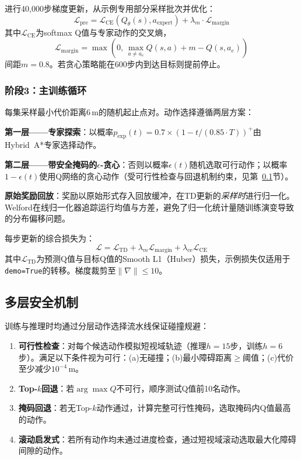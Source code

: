 \documentclass[conference]{IEEEtran}
\newcommand{\Qnet}{Q_\theta}
\begin{document}
进行40{,}000步梯度更新，从示例专用部分采样批次并优化：
\begin{equation}
    \mathcal{L}_{\text{pre}} = \mathcal{L}_{\text{CE}}(\Qnet(s), a_{\text{expert}}) + \lambda_m \cdot \mathcal{L}_{\text{margin}}
\end{equation}
其中$\mathcal{L}_{\text{CE}}$为softmax Q值与专家动作的交叉熵，
\begin{equation}
    \mathcal{L}_{\text{margin}} = \max\left(0,\, \max_{a \neq a_e} Q(s,a) + m - Q(s, a_e)\right)
\end{equation}
间距$m = 0.8$。若贪心策略能在600步内到达目标则提前停止。

\subsubsection{阶段3：主训练循环}

每集采样最小代价距离6\,m的随机起止点对。动作选择遵循两层方案：

\textbf{第一层——专家探索}：以概率$p_{\text{exp}}(t) = 0.7 \times (1 - t / (0.85 \cdot T))^+$由Hybrid~A*专家选择动作。

\textbf{第二层——带安全掩码的$\epsilon$-贪心}：否则以概率$\epsilon(t)$随机选取可行动作；以概率$1 - \epsilon(t)$使用Q网络的贪心动作（受可行性检查与回退机制约束，见第~\ref{sec:safety}节）。

\textbf{原始奖励回放}：奖励以原始形式存入回放缓冲，在TD更新的\emph{采样时}进行归一化。Welford在线归一化器追踪运行均值与方差，避免了归一化统计量随训练演变导致的分布偏移问题。

每步更新的综合损失为：
\begin{equation}
    \mathcal{L} = \mathcal{L}_{\text{TD}} + \lambda_m \mathcal{L}_{\text{margin}} + \lambda_{\text{ce}} \mathcal{L}_{\text{CE}}
\end{equation}
其中$\mathcal{L}_{\text{TD}}$为预测Q值与目标Q值的Smooth L1（Huber）损失，示例损失仅适用于\texttt{demo=True}的转移。梯度裁剪至$\|\nabla\| \leq 10$。

\subsection{多层安全机制}\label{sec:safety}

训练与推理时均通过分层动作选择流水线保证碰撞规避：
\begin{enumerate}
    \item \textbf{可行性检查}：对每个候选动作模拟短视域轨迹（推理$h=15$步，训练$h=6$步）。满足以下条件视为可行：(a)无碰撞；(b)最小障碍距离$\geq$阈值；(c)代价至少减少$10^{-4}$\,m。
    \item \textbf{Top-$k$回退}：若$\arg\max Q$不可行，顺序测试Q值前10名动作。
    \item \textbf{掩码回退}：若无Top-$k$动作通过，计算完整可行性掩码，选取掩码内Q值最高的动作。
    \item \textbf{滚动启发式}：若所有动作均未通过进度检查，通过短视域滚动选取最大化障碍间隙的动作。
\end{enumerate}
\end{document}

